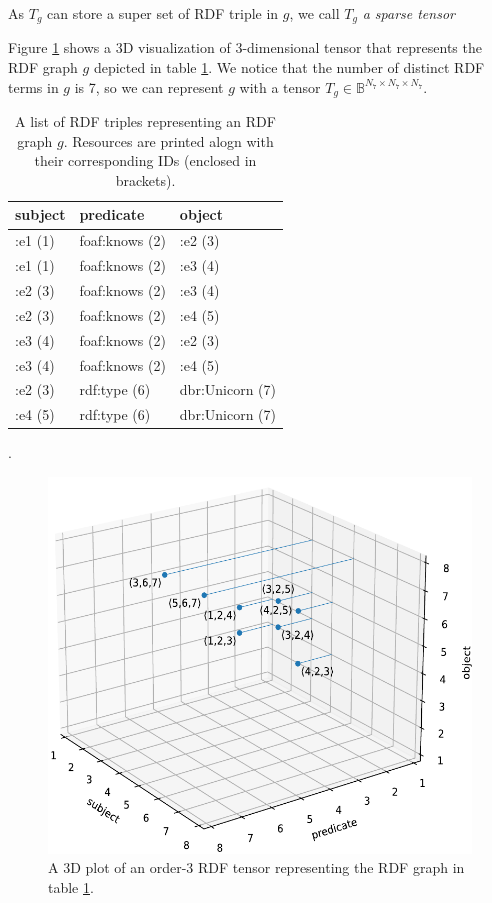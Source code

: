 \begin{remark}
	As $T_g$ can store a super set of RDF triple in $g$, we call $T_g$ \textit{a sparse tensor}
\end{remark}

\begin{example}
\label{ex:rdf_tensor}
Figure \ref{fig:rdf_tensor} shows a 3D visualization of 3-dimensional tensor that represents the RDF graph $g$ depicted in table \ref{tab:rdf_tensor}. We notice that the number of distinct RDF terms in $g$ is 7, so we can represent $g$ with a tensor $T_g \in \mathbb{B}^{N_7 \times N_7 \times N_7}$. 
\end{example}

\begin{table}[h]
	\centering
	\begin{tabular}{lll}
		\textbf{subject} & \textbf{predicate} & \textbf{object} \\ \hline
		:e1 (1) & foaf:knows (2) & :e2 (3) \\
		:e1 (1) & foaf:knows (2) & :e3 (4) \\
		:e2 (3) & foaf:knows (2) & :e3 (4) \\
		:e2 (3) & foaf:knows (2) & :e4 (5)  \\
		:e3 (4) & foaf:knows (2) & :e2 (3) \\ 
		:e3 (4) & foaf:knows (2) & :e4 (5) \\
		:e2 (3) & rdf:type (6) & dbr:Unicorn (7) \\
		:e4 (5) & rdf:type (6) & dbr:Unicorn (7) \\
	\end{tabular}
	\caption{A list of RDF triples representing an RDF graph $g$. Resources are printed alogn with their corresponding IDs (enclosed in brackets).}. 
	\label{tab:rdf_tensor}
\end{table}

\begin{figure}[h]
	\centering
	\includegraphics{figures/chapter2/3Dcoord-cut}
	\caption{A 3D plot of an order-3 RDF tensor representing the RDF graph in table \ref{tab:rdf_tensor}.}
	\label{fig:rdf_tensor}
\end{figure}

